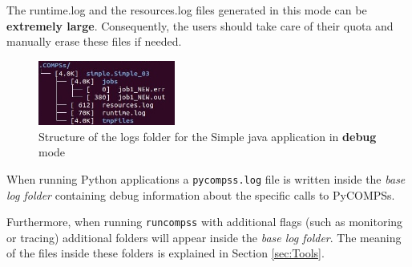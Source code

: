 The runtime.log and the resources.log files generated in this mode can be \textbf{extremely large}. Consequently, the users should
take care of their quota and manually erase these files if needed. \newline

\begin{figure}[!ht]
  \centering
    \includegraphics[width=0.4\textwidth]{./Sections/3_Results_and_Logs/Figures/simple_log_debug.jpeg}
    \caption{Structure of the logs folder for the Simple java application in \textbf{debug} mode}
    \label{fig:simple_log_debug}
\end{figure}

When running Python applications a \texttt{pycompss.log} file is written inside the \textit{base log folder} containing debug
information about the specific calls to PyCOMPSs. 

Furthermore, when running \texttt{runcompss} with additional flags (such as monitoring or tracing) additional folders will appear inside the 
\textit{base log folder}. The meaning of the files inside these folders is explained in Section \ref{sec:Tools}. 
